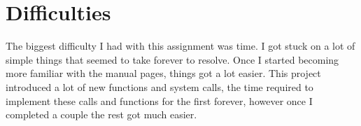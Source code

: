 \documentclass[12pt,letterpaper]{article}
\begin{document}
\section{Difficulties}
The biggest difficulty I had with this assignment was time. I got stuck on a lot of simple things that seemed to take forever to resolve. Once I started becoming more familiar with the manual pages, things got a lot easier. This project introduced a lot of new functions and system calls, the time required to implement these calls and functions for the first forever, however once I completed a couple the rest got much easier.
\end{document}
